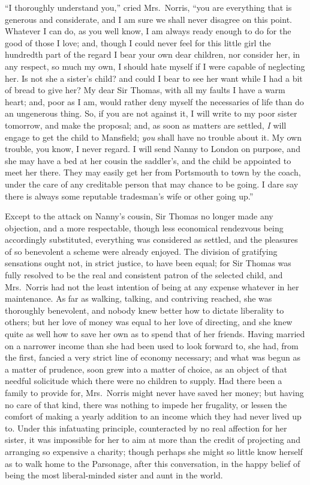 ``I thoroughly understand you,'' cried Mrs.\ Norris,
``you are everything that is generous and considerate,
and I am sure we shall never disagree on this point.
Whatever I can do, as you well know, I am always ready
enough to do for the good of those I love; and, though I
could never feel for this little girl the hundredth
part of the regard I bear your own dear children,
nor consider her, in any respect, so much my own,
I should hate myself if I were capable of neglecting her.
Is not she a sister's child? and could I bear to see
her want while I had a bit of bread to give her?
My dear Sir Thomas, with all my faults I have a warm heart;
and, poor as I am, would rather deny myself the necessaries
of life than do an ungenerous thing.  So, if you are not
against it, I will write to my poor sister tomorrow,
and make the proposal; and, as soon as matters are settled,
\emph{I} will engage to get the child to Mansfield; \emph{you} shall
have no trouble about it.  My own trouble, you know,
I never regard.  I will send Nanny to London on purpose,
and she may have a bed at her cousin the saddler's, and the
child be appointed to meet her there.  They may easily get
her from Portsmouth to town by the coach, under the care
of any creditable person that may chance to be going.
I dare say there is always some reputable tradesman's wife
or other going up.''

Except to the attack on Nanny's cousin, Sir Thomas no longer
made any objection, and a more respectable, though less
economical rendezvous being accordingly substituted,
everything was considered as settled, and the pleasures
of so benevolent a scheme were already enjoyed.
The division of gratifying sensations ought not,
in strict justice, to have been equal; for Sir Thomas was
fully resolved to be the real and consistent patron of the
selected child, and Mrs.\ Norris had not the least intention
of being at any expense whatever in her maintenance.
As far as walking, talking, and contriving reached,
she was thoroughly benevolent, and nobody knew better
how to dictate liberality to others; but her love of money
was equal to her love of directing, and she knew quite as
well how to save her own as to spend that of her friends.
Having married on a narrower income than she had been
used to look forward to, she had, from the first,
fancied a very strict line of economy necessary;
and what was begun as a matter of prudence, soon grew
into a matter of choice, as an object of that needful
solicitude which there were no children to supply.
Had there been a family to provide for, Mrs.\ Norris might
never have saved her money; but having no care of that kind,
there was nothing to impede her frugality, or lessen the
comfort of making a yearly addition to an income which they
had never lived up to.  Under this infatuating principle,
counteracted by no real affection for her sister,
it was impossible for her to aim at more than the credit
of projecting and arranging so expensive a charity;
though perhaps she might so little know herself as to
walk home to the Parsonage, after this conversation,
in the happy belief of being the most liberal-minded
sister and aunt in the world.

